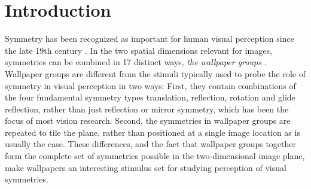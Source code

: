 \documentclass[11pt, twoside]{article}
\begin{document}
\section*{Introduction}
Symmetry has been recognized as important for human visual perception since the late 19th century \citep{mach_1959}. In the two spatial dimensions relevant for images, symmetries can be combined in 17 distinct ways, \textit{the wallpaper groups} \citep{RN1562,RN1563,RN1425}. Wallpaper groups are different from the stimuli typically used to probe the role of symmetry in visual perception in two ways: First, they contain combinations of the four fundamental symmetry types translation, reflection, rotation and glide reflection, rather than just reflection or mirror symmetry, which has been the focus of most vision research. Second, the symmetries in wallpaper groups are repeated to tile the plane, rather than positioned at a single image location as is usually the case. These differences, and the fact that wallpaper groups together form the complete set of symmetries possible in the two-dimensional image plane, make wallpapers an interesting stimulus set for studying perception of visual symmetries.
\end{document}
